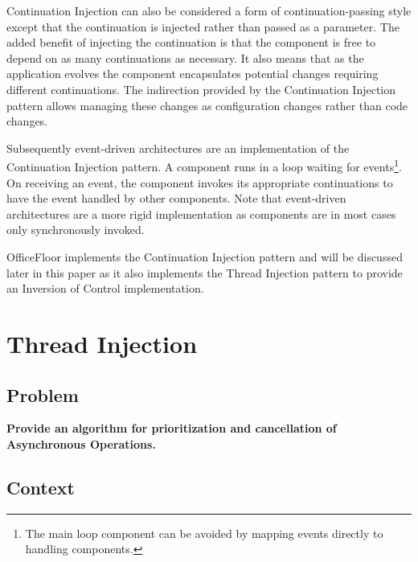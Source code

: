 \documentclass[prodmode]{style/acmlarge}
\begin{document}
Continuation Injection can also be considered a form of continuation-passing
style \cite{continuations} except that the continuation is injected rather than
passed as a parameter.  The added benefit of injecting the continuation is that
the component is free to depend on as many continuations as necessary.  It also
means that as the application evolves the component encapsulates potential
changes requiring different continuations.  The indirection provided by the
Continuation Injection pattern allows managing these changes as configuration
changes rather than code changes.

Subsequently event-driven architectures are an implementation of the
Continuation Injection pattern.  A component runs in a loop waiting for
events\footnote{The main loop component can be avoided by mapping events
directly to handling components.}.  On receiving an event, the component invokes
its appropriate continuations to have the event handled by other components. 
Note that event-driven architectures are a more rigid implementation as
components are in most cases only synchronously invoked.

OfficeFloor \cite{officefloor} implements the Continuation Injection pattern and
will be discussed later in this paper as it also implements the Thread Injection
pattern to provide an Inversion of Control implementation.



\section{Thread Injection}


\subsection{Problem}

\textbf{Provide an algorithm for prioritization and cancellation of Asynchronous Operations.}


\subsection{Context}
\end{document}
